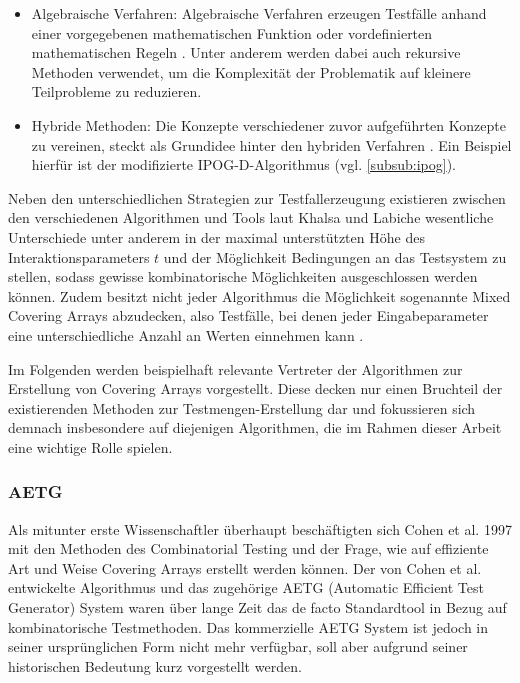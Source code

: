 \begin{itemize}
\item Algebraische Verfahren: Algebraische Verfahren erzeugen Testfälle anhand einer vorgegebenen mathematischen Funktion oder vordefinierten mathematischen Regeln \cite{khalsa2014orchestrated}. Unter anderem werden dabei auch rekursive Methoden verwendet, um die Komplexität der Problematik auf kleinere Teilprobleme zu reduzieren.
\item Hybride Methoden: Die Konzepte verschiedener zuvor aufgeführten Konzepte zu vereinen, steckt als Grundidee hinter den hybriden Verfahren \cite{khalsa2014orchestrated}. Ein Beispiel hierfür ist der modifizierte IPOG-D-Algorithmus (vgl. \autoref{subsub:ipog}).
\end{itemize}

Neben den unterschiedlichen Strategien zur Testfallerzeugung existieren zwischen den verschiedenen Algorithmen und Tools laut Khalsa und Labiche \cite{khalsa2014orchestrated} wesentliche Unterschiede unter anderem in der maximal unterstützten Höhe des Interaktionsparameters $t$ und der Möglichkeit Bedingungen an das Testsystem zu stellen, sodass gewisse kombinatorische Möglichkeiten ausgeschlossen werden können. Zudem besitzt nicht jeder Algorithmus die Möglichkeit sogenannte Mixed Covering Arrays abzudecken, also Testfälle, bei denen jeder Eingabeparameter eine unterschiedliche Anzahl an Werten einnehmen kann \cite{khalsa2014orchestrated}.

Im Folgenden werden beispielhaft relevante Vertreter der Algorithmen zur Erstellung von Covering Arrays vorgestellt. Diese decken nur einen Bruchteil der existierenden Methoden zur Testmengen-Erstellung dar und fokussieren sich demnach insbesondere auf diejenigen Algorithmen, die im Rahmen dieser Arbeit eine wichtige Rolle spielen.

\subsubsection{AETG}\label{subsub:aetg}

Als mitunter erste Wissenschaftler überhaupt beschäftigten sich Cohen et al. \cite{cohen1997aetg} 1997 mit den Methoden des Combinatorial Testing und der Frage, wie auf effiziente Art und Weise Covering Arrays erstellt werden können. Der von Cohen et al. \cite{cohen1997aetg} entwickelte Algorithmus und das zugehörige AETG (Automatic Efficient Test Generator) System waren über lange Zeit das de facto Standardtool in Bezug auf kombinatorische Testmethoden. Das kommerzielle AETG System ist jedoch in seiner ursprünglichen Form nicht mehr verfügbar, soll aber aufgrund seiner historischen Bedeutung kurz vorgestellt werden.

